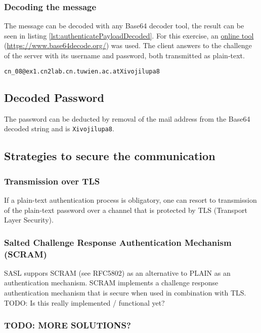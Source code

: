 \documentclass[parskip=full]{scrartcl}
\begin{document}
\subsubsection{Decoding the message}
The message can be decoded with any Base64 decoder tool, the result can be seen in listing \ref{lst:authenticatePayloadDecoded}.
For this exercise, an \href{https://www.base64decode.org/}{online tool} (\url{https://www.base64decode.org/}) was used.
The client answers to the challenge of the server with its username and password, both transmitted as plain-text.
\begin{lstlisting}[language=tex, breaklines, frame=single, caption={Base64 encoded message}, label=lst:authenticatePayloadDecoded, float, floatplacement=h]
cn_08@ex1.cn2lab.cn.tuwien.ac.atXivojilupa8
\end{lstlisting}

\subsection{Decoded Password}
The password can be deducted by removal of the mail address from the Base64 decoded string and is \texttt{Xivojilupa8}.

\subsection{Strategies to secure the communication}
\subsubsection{Transmission over TLS}
If a plain-text authentication process is obligatory, one can resort to transmission of the plain-text password over a channel that is protected by TLS (Transport Layer Security).

\subsubsection{Salted Challenge Response Authentication Mechanism (SCRAM)}
SASL suppors SCRAM (see RFC5802) as an alternative to PLAIN as an authentication mechanism.
SCRAM implements a challenge response authentication mechanism that is secure when used in combination with TLS. 
TODO: Is this really implemented / functional yet?

\subsubsection{TODO: MORE SOLUTIONS?}
\end{document}
